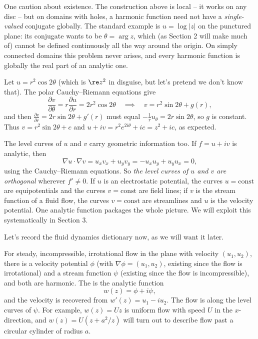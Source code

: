 One caution about existence. The construction above is local -- it works on any disc -- but on domains with holes, a harmonic function need not have a \emph{single-valued} conjugate globally. The standard example is $u = \log|z|$ on the punctured plane: its conjugate wants to be $\theta = \arg z$, which (as Section 2 will make much of) cannot be defined continuously all the way around the origin. On simply connected domains this problem never arises, and every harmonic function is globally the real part of an analytic one.

\begin{example}
	Let $u = r^2 \cos 2\theta$ (which is $\re z^2$ in disguise, but let's pretend we don't know that). The polar Cauchy--Riemann equations give
	$$
	\frac{\partial v}{\partial \theta} = r \frac{\partial u}{\partial r} = 2r^2 \cos 2\theta
	\quad\implies\quad
	v = r^2 \sin 2\theta + g(r),
	$$
	and then $\frac{\partial v}{\partial r} = 2r \sin 2\theta + g'(r)$ must equal $-\frac 1r u_\theta = 2r \sin 2\theta$, so $g$ is constant. Thus $v = r^2 \sin 2\theta + c$ and $u + iv = r^2 e^{2i\theta} + ic = z^2 + ic$, as expected.
\end{example}

The level curves of $u$ and $v$ carry geometric information too. If $f = u + iv$ is analytic, then
$$
\nabla u \cdot \nabla v = u_x v_x + u_y v_y = -u_x u_y + u_y u_x = 0,
$$
using the Cauchy--Riemann equations. So \emph{the level curves of $u$ and $v$ are orthogonal} wherever $f' \neq 0$. If $u$ is an electrostatic potential, the curves $u = \text{const}$ are equipotentials and the curves $v = \text{const}$ are field lines; if $v$ is the stream function of a fluid flow, the curves $v = \text{const}$ are streamlines and $u$ is the velocity potential. One analytic function packages the whole picture. We will exploit this systematically in Section 3.

Let's record the fluid dynamics dictionary now, as we will want it later.

\begin{remark}
	For steady, incompressible, irrotational flow in the plane with velocity $(u_1, u_2)$, there is a velocity potential $\phi$ (with $\nabla \phi = (u_1, u_2)$, existing since the flow is irrotational) and a stream function $\psi$ (existing since the flow is incompressible), and both are harmonic. The  is the analytic function
	$$
	w(z) = \phi + i \psi,
	$$
	and the velocity is recovered from $w'(z) = u_1 - i u_2$. The flow is along the level curves of $\psi$. For example, $w(z) = Uz$ is uniform flow with speed $U$ in the $x$-direction, and $w(z) = U(z + a^2/z)$ will turn out to describe flow past a circular cylinder of radius $a$.
\end{remark}

